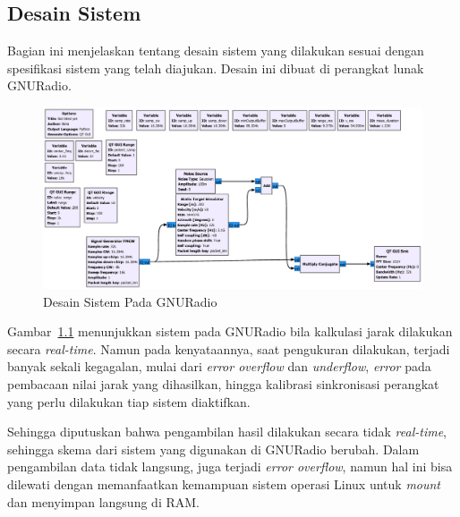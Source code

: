 \chapter{\babEmpat}

\section{Desain Sistem}

Bagian ini menjelaskan tentang desain sistem yang dilakukan sesuai dengan spesifikasi sistem yang telah diajukan. Desain ini dibuat di perangkat lunak GNURadio.

\begin{figure}
	\centering
	\includegraphics[scale=0.25]{pics/bab4/Simulasi.jpg}
	\caption{Desain Sistem Pada GNURadio}
	\label{fig:DesainSistem}
\end{figure}

Gambar~\ref{fig:DesainSistem} menunjukkan sistem pada GNURadio bila kalkulasi jarak dilakukan secara \textit{real-time}. Namun pada kenyataannya, saat pengukuran dilakukan, terjadi banyak sekali kegagalan, mulai dari \textit{error overflow} dan \textit{underflow}, \textit{error} pada pembacaan nilai jarak yang dihasilkan, hingga kalibrasi sinkronisasi perangkat yang perlu dilakukan tiap sistem diaktifkan.

Sehingga diputuskan bahwa pengambilan hasil dilakukan secara tidak \textit{real-time}, sehingga skema dari sistem yang digunakan di GNURadio berubah. Dalam pengambilan data tidak langsung, juga terjadi \textit{error overflow}, namun hal ini bisa dilewati dengan memanfaatkan kemampuan sistem operasi Linux untuk \textit{mount} dan menyimpan langsung di RAM.

